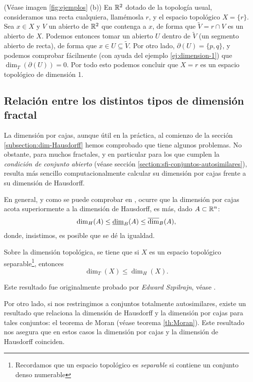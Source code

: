 \begin{ejemplo}
(Véase imagen \ref{fig:ejemplos} (b))
En $\mathbb{R}^2$ dotado de la topología usual, consideramos una recta cualquiera, llamémosla $r$, y el espacio topológico $X=\{r\}$. Sea $x\in X$ y $V$ un abierto de $\mathbb{R}^2$ que contenga a $x$, de forma que $\tilde{V} = r\cap V$ es un abierto de $X$. Podemos entonces tomar un abierto $U$ dentro de $\tilde{V}$ (un segmento abierto de recta), de forma que $x\in U\subseteq \tilde{V}$. Por otro lado, $\partial(U)=\{p,q\}$, y podemos comprobar fácilmente (con ayuda del ejemplo \ref{ej:dimension-1}) que $\dim_T(\partial(U))=0$. Por todo esto podemos concluir que $X=r$ es un espacio topológico de dimensión 1. 
\end{ejemplo}

\subsection{Relación entre los distintos tipos de dimensión fractal}
\label{subsection:relacion-dimensiones}

La dimensión por cajas, aunque útil en la práctica, al comienzo de la sección \ref{subsection:dim-Hausdorff} hemos comprobado que tiene algunos problemas. No obstante, para muchos fractales, y en particular para los que cumplen la \textit{condición de conjunto abierto} (véase sección \ref{section:sfi-conjuntos-autosimilares}), resulta más sencillo computacionalmente calcular su dimensión por cajas frente a su dimensión de Hausdorff.

En general, y como se puede comprobar en \cite[Sección 3.1]{alma991007022459704990}, ocurre que la dimensión por cajas acota superiormente a la dimensión de Hausdorff, es más, dado $A\subset\mathbb{R}^n$:
$$
\dim_H(A)\leq\underline{\dim}_B (A) \leq \overline{\dim}_B (A),
$$
donde, insistimos, es posible que se dé la igualdad.

Sobre la dimensión topológica, se tiene que si $X$ es un espacio topológico separable\footnote{Recordamos que un espacio topológico es \textit{separable} si contiene un conjunto denso numerable}, entonces
$$
\dim_T(X)\leq\dim_H(X).
$$

Este resultado fue originalmente probado por \textit{Edward Szpilrajn}, véase \cite[Capítulo VII]{Hurewicz-Wallman}.

Por otro lado, si nos restringimos a conjuntos totalmente autosimilares, existe un resultado que relaciona la dimensión de Hausdorff y la dimensión por cajas para tales conjuntos: el teorema de Moran (véase teorema \ref{th:Moran}). Este resultado nos asegura que en estos casos la dimensión por cajas y la dimensión de Hausdorff coinciden. 

